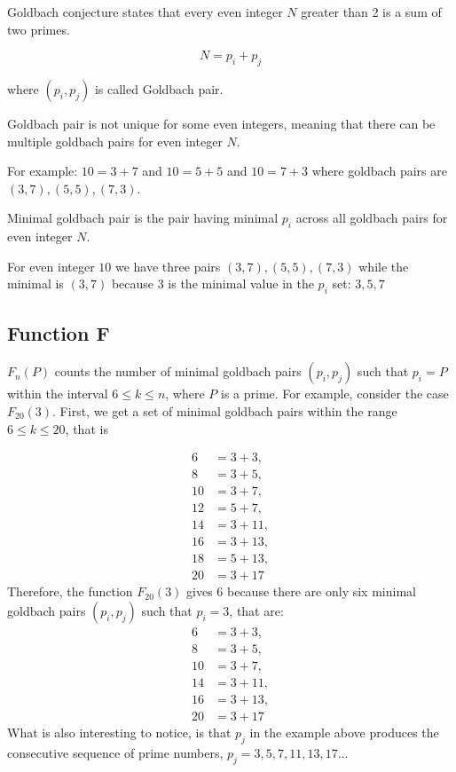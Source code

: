 \usepackage{amsmath}Goldbach conjecture states that every even integer $N$ greater than 2 is a sum of two primes.

$$N = p_i + p_j$$

where $(p_i, p_j)$ is called Goldbach pair.

Goldbach pair is not unique for some even integers, meaning that there can be multiple goldbach pairs for even integer $N$.

For example: $10=3+7$ and $10=5+5$ and $10=7+3$ where goldbach pairs are $(3,7), (5,5), (7,3)$.

Minimal goldbach pair is the pair having minimal $p_i$ across all goldbach pairs for even integer $N$.

For even integer $10$ we have three pairs $(3,7), (5,5), (7,3)$ while the minimal is $(3,7)$ because
$3$ is the minimal value in the $p_i$ set: $3, 5, 7$

\subsection{Function F}\label{subsec:function-f}
$F_{n}(P)$ counts the number of minimal goldbach pairs $(p_i, p_j)$ such that $p_i=P$ within the interval $6 \leq k \leq n$,
where $P$ is a prime.
For example, consider the case $F_{20}(3)$.
First, we get a set of minimal goldbach pairs within the range $6 \leq k \leq 20$, that is

\begin{align*}
    6 &= 3 + 3, \\
    8 &= 3 + 5, \\
    10 &= 3 + 7, \\
    12 &= 5 + 7, \\
    14 &= 3 + 11, \\
    16 &= 3 + 13, \\
    18 &= 5 + 13, \\
    20 &= 3 + 17
\end{align*}
Therefore, the function $F_{20}(3)$ gives $6$ because there are only six minimal goldbach pairs $(p_i, p_j)$ such that
$p_i=3$, that are:
\begin{align*}
    6 &= 3 + 3, \\
    8 &= 3 + 5, \\
    10 &= 3 + 7, \\
    14 &= 3 + 11, \\
    16 &= 3 + 13, \\
    20 &= 3 + 17
\end{align*}
What is also interesting to notice, is that $p_j$ in the example above produces the consecutive sequence of prime numbers,
$p_j = 3, 5, 7, 11, 13, 17 \dots$
